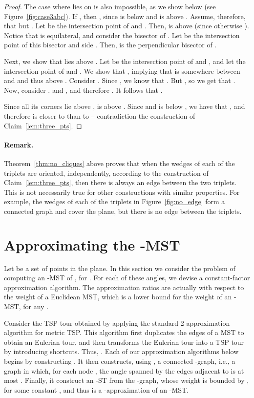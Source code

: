 \documentclass[11pt]{article}
\begin{document}
\begin{proof}
The case where  lies on  is also impossible, as we show below (see Figure~\ref{fig:case3abc}).
If , then , since  is below  and  is above . Assume, therefore, that  but .
Let  be the intersection point of  and . Then,  is above  (since otherwise ). 
Notice that  is equilateral, and consider the bisector of .
Let  be the intersection point of this bisector and side . Then,  is the perpendicular bisector of .

Next, we show that  lies above .
Let  be the intersection point of  and , and let  the intersection point of
 and .
We show that , implying that  is somewhere between  and  and thus above .
Consider . Since , we know that . But , so we get that . Now, consider .
 and , and therefore .
It follows that
.

Since all its corners lie above ,  is above . Since  and  is below , we have that 
, and therefore  is closer to  than to  -- contradiction the construction of Claim~\ref{lem:three_pts}. 
\end{proof}






\paragraph{Remark.} 
Theorem~\ref{thm:no_cliques} above proves that when the wedges of each of the triplets are oriented, independently, according to the construction of Claim~\ref{lem:three_pts}, then there is always an edge between the two triplets. This is not necessarily true for other constructions with similar properties. For example, the wedges of each of the triplets in Figure~\ref{fig:no_edge} form a connected graph and cover the plane, but there is no edge between the triplets. 

\section{Approximating the -MST} \label{sec:tsp_apx}
Let  be a set of  points in the plane.
In this section we consider the problem of computing an -MST of , for . For each of these angles, we devise a constant-factor approximation algorithm. The approximation ratios are actually with respect to the weight of a Euclidean MST, which is a lower bound for the weight of an -MST, for any .
 
Consider the TSP tour  obtained by applying the standard 2-approximation algorithm for metric TSP. This algorithm first duplicates the edges of a MST to obtain an Eulerian tour, and then transforms the Eulerian tour into a TSP tour by introducing shortcuts. Thus, .  
Each of our approximation algorithms below begins by constructing . It then constructs, using , a connected -graph, i.e., a graph in which, for each node , the angle spanned by the edges adjacent to  is at most . Finally, it construct an -ST from the -graph, whose weight is bounded by , for some constant , and thus is a -approximation of an -MST.
\end{document}
